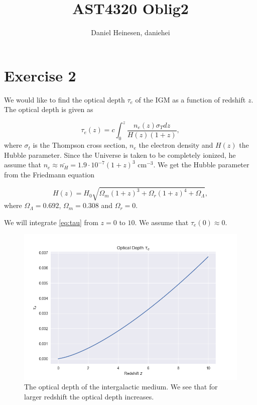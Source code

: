 \documentclass[a4paper,norsk, 10pt]{article}
\title{AST4320 Oblig2}
\author{Daniel Heinesen, daniehei}
\begin{document}
\maketitle

\section{Exercise 2}

We would like to find the optical depth $\tau_e$ of the IGM as a function of redshift $z$. The optical depth is given as

\begin{equation}\label{eq:tau}
\tau_e(z) = c\int_0^z \frac{n_e(z) \sigma_T dz}{H(z)(1+z)},
\end{equation}
where $\sigma_t$ is the Thompson cross section, $n_e$ the electron density and $H(z)$ the Hubble parameter. Since the Universe is taken to be completely ionized, he assume that $n_e \approx \bar{n_H} = 1.9 \cdot 10^{-7} (1+z)^3 $ cm$^{-3}$. We get the Hubble parameter from the Friedmann equation

\begin{equation}
H(z) = H_0 \sqrt{\Omega_m (1+z)^3 + \Omega_r(1+z)^4 + \Omega_{\Lambda}},
\end{equation}
where $\Omega_{\Lambda} = 0.692$, $\Omega_m = 0.308$ and $\Omega_r = 0$.

We will integrate \eqref{eq:tau} from $z=0$ to $10$. We assume that $\tau_e(0) \approx 0$.


\begin{figure}[H]
\centering
\includegraphics[scale=0.7]{tau}
\caption{The optical depth of the intergalactic medium. We see that for larger redshift the optical depth increases.}
\end{figure}
\end{document}
